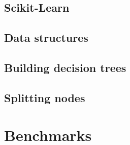 \subsection{Scikit-Learn}


\subsection{Data structures}


\subsection{Building decision trees}


\subsection{Splitting nodes}






\section{Benchmarks}
\label{sec:5:benchmarks}



